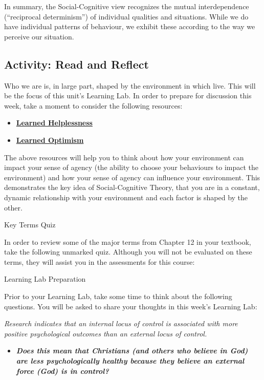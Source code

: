 \documentclass[
]{book}
\providecommand{\tightlist}{%
  \setlength{\itemsep}{0pt}\setlength{\parskip}{0pt}}
\begin{document}
In summary, the Social-Cognitive view recognizes the mutual interdependence (``reciprocal determinism'') of individual qualities and situations. While we do have individual patterns of behaviour, we exhibit these according to the way we perceive our situation.

\hypertarget{activity-read-and-reflect-4}{%
\subsection*{Activity: Read and Reflect}\label{activity-read-and-reflect-4}}

\begin{reflect}
Who we are is, in large part, shaped by the environment in which live. This will be the focus of this unit's Learning Lab. In order to prepare for discussion this week, take a moment to consider the following resources:

\begin{itemize}
\tightlist
\item
  \href{http://www.ldonline.org/article/6154/}{\textbf{Learned Helplessness}}\\
\item
  \href{https://nesslabs.com/learned-optimism}{\textbf{Learned Optimism}}
\end{itemize}

The above resources will help you to think about how your environment can impact your sense of agency (the ability to choose your behaviours to impact the environment) and how your sense of agency can influence your environment. This demonstrates the key idea of Social-Cognitive Theory, that you are in a constant, dynamic relationship with your environment and each factor is shaped by the other.

{Key Terms Quiz}

In order to review some of the major terms from Chapter 12 in your textbook, take the following unmarked quiz. Although you will not be evaluated on these terms, they will assist you in the assessments for this course:

{Learning Lab Preparation}

Prior to your Learning Lab, take some time to think about the following questions. You will be asked to share your thoughts in this week's Learning Lab:

\emph{Research indicates that an internal locus of control is associated with more positive psychological outcomes than an external locus of control.}

\begin{itemize}
\tightlist
\item
  \textbf{\emph{Does this mean that Christians (and others who believe in God) are less psychologically healthy because they believe an external force (God) is in control?}}
\end{itemize}
\end{reflect}
\end{document}
